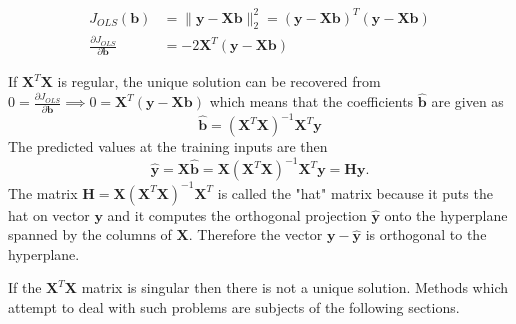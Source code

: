 \documentclass[11pt,american]{book} %
\theoremstyle{plain}
\theoremstyle{definition}
\begin{document}
\begin{equation}
	\begin{aligned}
		J_{OLS}(\bm{b}) &=  \lVert \bm{y}-\bm{X}\bm{b}\rVert_{2}^2 = ( \bm{y}-\bm{X}\bm{b})^{T} (\bm{y}-\bm{X}\bm{b}) \\
		\frac{\partial J_{OLS}} {\partial \bm{b}} &= -2 \bm{X}^T (\bm{y} - \bm{X}\bm{b})
	\end{aligned}
	\label{derivative}
\end{equation}


If $\bm{X}^{T}\bm{X}$ is regular, the unique solution can be recovered from $0 = \frac{\partial J_{OLS}} {\partial \bm{b}} \implies 0 =  \bm{X}^T (\bm{y} - \bm{X}\bm{b})$ which means that the coefficients $\bm{\hat{b}}$ are given as
\begin{equation}
	\bm{\hat{b}}=(\bm{X}^{T}\bm{X})^{-1}\bm{X}^{T}\bm{y}
\end{equation}
The predicted values at the training inputs are then
\begin{equation}
	\bm{\hat{y}} = \bm{X}\bm{\hat{b}} = \bm{X}(\bm{X}^T \bm{X})^{-1}\bm{X}^T \bm{y} = \bm{H} \bm{y}.
\end{equation}
The matrix $\bm{H} =\bm{X}(\bm{X}^T \bm{X})^{-1}\bm{X}^T$ is called the "hat" matrix because it puts the hat on vector $\bm{y}$ and it computes the orthogonal projection $\bm{{\hat{y}}}$ onto the hyperplane spanned by the columns of $\bm{X}$. Therefore the vector $\bm{y} - \bm{\hat{y}}$ is orthogonal to the hyperplane.

If the $\bm{X}^{T}\bm{X}$ matrix is singular then there is not a unique solution. Methods which attempt to deal with such problems are subjects of the following sections.
\end{document}

